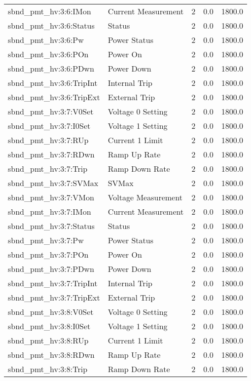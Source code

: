 \begin{center}
\begin{longtable}{l | l l l l }
sbnd\_pmt\_hv:3:6:IMon & Current Measurement & 2 & 0.0 & 1800.0\\ 
sbnd\_pmt\_hv:3:6:Status & Status & 2 & 0.0 & 1800.0\\ 
sbnd\_pmt\_hv:3:6:Pw & Power Status & 2 & 0.0 & 1800.0\\ 
sbnd\_pmt\_hv:3:6:POn & Power On & 2 & 0.0 & 1800.0\\ 
sbnd\_pmt\_hv:3:6:PDwn & Power Down & 2 & 0.0 & 1800.0\\ 
sbnd\_pmt\_hv:3:6:TripInt & Internal Trip & 2 & 0.0 & 1800.0\\ 
sbnd\_pmt\_hv:3:6:TripExt & External Trip & 2 & 0.0 & 1800.0\\ 
sbnd\_pmt\_hv:3:7:V0Set & Voltage 0 Setting & 2 & 0.0 & 1800.0\\ 
sbnd\_pmt\_hv:3:7:I0Set & Voltage 1 Setting & 2 & 0.0 & 1800.0\\ 
sbnd\_pmt\_hv:3:7:RUp & Current 1 Limit & 2 & 0.0 & 1800.0\\ 
sbnd\_pmt\_hv:3:7:RDwn & Ramp Up Rate & 2 & 0.0 & 1800.0\\ 
sbnd\_pmt\_hv:3:7:Trip & Ramp Down Rate & 2 & 0.0 & 1800.0\\ 
sbnd\_pmt\_hv:3:7:SVMax & SVMax & 2 & 0.0 & 1800.0\\ 
sbnd\_pmt\_hv:3:7:VMon & Voltage Measurement & 2 & 0.0 & 1800.0\\ 
sbnd\_pmt\_hv:3:7:IMon & Current Measurement & 2 & 0.0 & 1800.0\\ 
sbnd\_pmt\_hv:3:7:Status & Status & 2 & 0.0 & 1800.0\\ 
sbnd\_pmt\_hv:3:7:Pw & Power Status & 2 & 0.0 & 1800.0\\ 
sbnd\_pmt\_hv:3:7:POn & Power On & 2 & 0.0 & 1800.0\\ 
sbnd\_pmt\_hv:3:7:PDwn & Power Down & 2 & 0.0 & 1800.0\\ 
sbnd\_pmt\_hv:3:7:TripInt & Internal Trip & 2 & 0.0 & 1800.0\\ 
sbnd\_pmt\_hv:3:7:TripExt & External Trip & 2 & 0.0 & 1800.0\\ 
sbnd\_pmt\_hv:3:8:V0Set & Voltage 0 Setting & 2 & 0.0 & 1800.0\\ 
sbnd\_pmt\_hv:3:8:I0Set & Voltage 1 Setting & 2 & 0.0 & 1800.0\\ 
sbnd\_pmt\_hv:3:8:RUp & Current 1 Limit & 2 & 0.0 & 1800.0\\ 
sbnd\_pmt\_hv:3:8:RDwn & Ramp Up Rate & 2 & 0.0 & 1800.0\\ 
sbnd\_pmt\_hv:3:8:Trip & Ramp Down Rate & 2 & 0.0 & 1800.0\\ 

\end{longtable}
\end{center}
